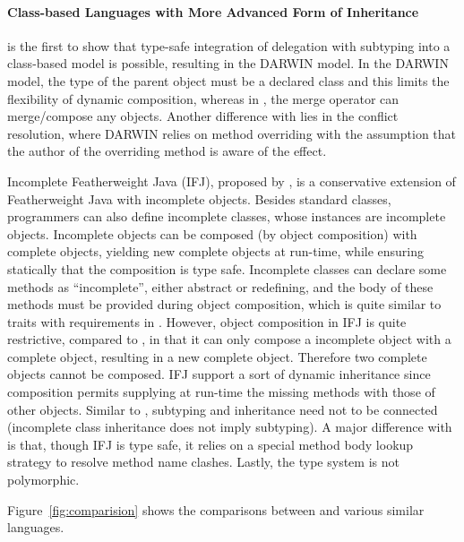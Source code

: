 \paragraph{Class-based Languages with More Advanced Form of Inheritance}

\citet{kniesel1999type} is the first to show that type-safe integration of
delegation with subtyping into a class-based model is possible, resulting in the
DARWIN model. In the DARWIN model, the type of the parent object must be a
declared class and this limits the flexibility of dynamic composition, whereas
in \name, the merge operator can merge/compose any objects. Another difference
with \name lies in the conflict resolution, where DARWIN relies on method
overriding with the assumption that the author of the overriding method is aware
of the effect.


Incomplete Featherweight Java (IFJ), proposed by \citet{bettini2008type}, is a
conservative extension of Featherweight Java with incomplete objects. Besides
standard classes, programmers can also define incomplete classes, whose
instances are incomplete objects. Incomplete objects can be composed (by object
composition) with complete objects, yielding new complete objects at run-time,
while ensuring statically that the composition is type safe. Incomplete classes
can declare some methods as ``incomplete'', either abstract or redefining, and
the body of these methods must be provided during object composition, which is
quite similar to traits with requirements in \name. However, object composition
in IFJ is quite restrictive, compared to \name, in that it can only compose a
incomplete object with a complete object, resulting in a new complete object.
Therefore two complete objects cannot be composed. IFJ support a sort of dynamic
inheritance since composition permits supplying at run-time the missing methods
with those of other objects. Similar to \name, subtyping and inheritance need
not to be connected (incomplete class inheritance does not imply subtyping). A
major difference with \name is that, though IFJ is type safe, it relies on a
special method body lookup strategy to resolve method name clashes. Lastly, the
type system is not polymorphic.



Figure~\ref{fig:comparision} shows the comparisons between \name and various
similar languages.

